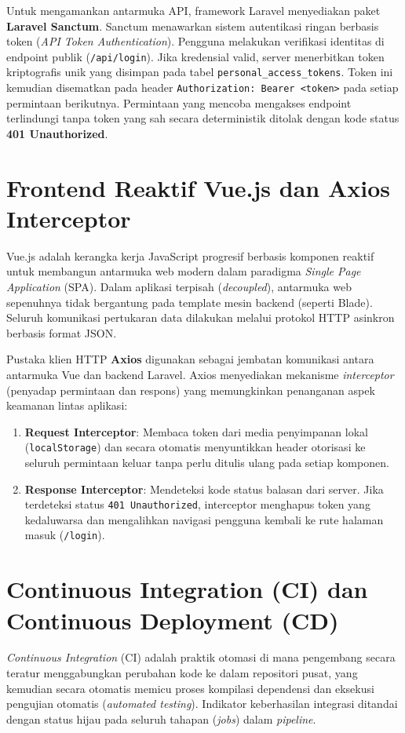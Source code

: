 \documentclass[a4paper,oneside,11pt]{book}
\begin{document}
Untuk mengamankan antarmuka API, framework Laravel menyediakan paket \textbf{Laravel Sanctum}. Sanctum menawarkan sistem autentikasi ringan berbasis token (\textit{API Token Authentication}). Pengguna melakukan verifikasi identitas di endpoint publik (\texttt{/api/login}). Jika kredensial valid, server menerbitkan token kriptografis unik yang disimpan pada tabel \texttt{personal\_access\_tokens}. Token ini kemudian disematkan pada header \texttt{Authorization: Bearer <token>} pada setiap permintaan berikutnya. Permintaan yang mencoba mengakses endpoint terlindungi tanpa token yang sah secara deterministik ditolak dengan kode status \textbf{401 Unauthorized}.

\section{Frontend Reaktif Vue.js dan Axios Interceptor}
Vue.js adalah kerangka kerja JavaScript progresif berbasis komponen reaktif untuk membangun antarmuka web modern dalam paradigma \textit{Single Page Application} (SPA). Dalam aplikasi terpisah (\textit{decoupled}), antarmuka web sepenuhnya tidak bergantung pada template mesin backend (seperti Blade). Seluruh komunikasi pertukaran data dilakukan melalui protokol HTTP asinkron berbasis format JSON.

Pustaka klien HTTP \textbf{Axios} digunakan sebagai jembatan komunikasi antara antarmuka Vue dan backend Laravel. Axios menyediakan mekanisme \textit{interceptor} (penyadap permintaan dan respons) yang memungkinkan penanganan aspek keamanan lintas aplikasi:
\begin{enumerate}
\item \textbf{Request Interceptor}: Membaca token dari media penyimpanan lokal (\texttt{localStorage}) dan secara otomatis menyuntikkan header otorisasi ke seluruh permintaan keluar tanpa perlu ditulis ulang pada setiap komponen.
\item \textbf{Response Interceptor}: Mendeteksi kode status balasan dari server. Jika terdeteksi status \texttt{401 Unauthorized}, interceptor menghapus token yang kedaluwarsa dan mengalihkan navigasi pengguna kembali ke rute halaman masuk (\texttt{/login}).
\end{enumerate}

\section{Continuous Integration (CI) dan Continuous Deployment (CD)}
\textit{Continuous Integration} (CI) adalah praktik otomasi di mana pengembang secara teratur menggabungkan perubahan kode ke dalam repositori pusat, yang kemudian secara otomatis memicu proses kompilasi dependensi dan eksekusi pengujian otomatis (\textit{automated testing}). Indikator keberhasilan integrasi ditandai dengan status hijau pada seluruh tahapan (\textit{jobs}) dalam \textit{pipeline}.
\end{document}

